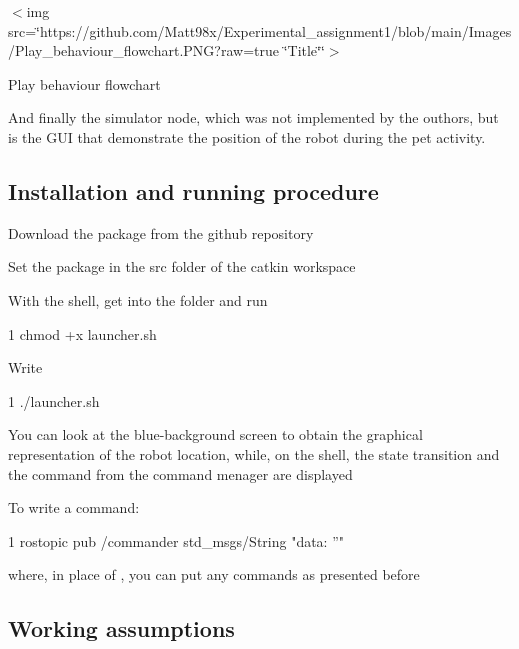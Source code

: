 $<$img src=\char`\"{}https\+://github.\+com/\+Matt98x/\+Experimental\+\_\+assignment1/blob/main/\+Images/\+Play\+\_\+behaviour\+\_\+flowchart.\+P\+N\+G?raw=true \char`\"{}Title\char`\"{}\char`\"{}$>$ 

Play behaviour flowchart 

And finally the simulator node, which was not implemented by the outhors, but is the G\+UI that demonstrate the position of the robot during the pet activity.

\subsection*{Installation and running procedure}


\begin{DoxyItemize}
\item Download the package from the github repository
\item Set the package in the src folder of the catkin workspace
\item With the shell, get into the folder and run 
\begin{DoxyCode}
1 chmod +x launcher.sh
\end{DoxyCode}

\item Write 
\begin{DoxyCode}
1 ./launcher.sh
\end{DoxyCode}

\item You can look at the blue-\/background screen to obtain the graphical representation of the robot location, while, on the shell, the state transition and the command from the command menager are displayed
\item To write a command\+: 
\begin{DoxyCode}
1 rostopic pub /commander std\_msgs/String "data: ''" 
\end{DoxyCode}
 where, in place of \textquotesingle{}\textquotesingle{}, you can put any commands as presented before
\end{DoxyItemize}

\subsection*{Working assumptions}

